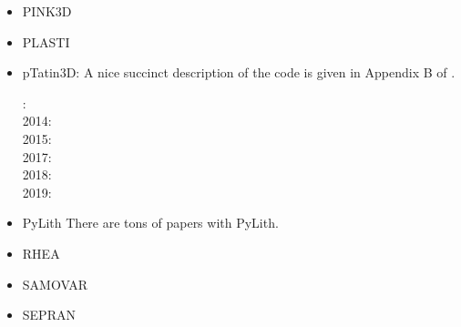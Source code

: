 \begin{itemize}
\item PINK3D

{\small
\noindent
\cite{vosc15}
}


\item PLASTI

{\small
\noindent
\cite{fuwb06}
}

\item pTatin3D: A nice succinct description of the code is given in Appendix B of \cite{lemh17}. 

{\small
{}: \cite{phil13}\\
2014: \cite{mabl14}\\
2015: \cite{mabl15}\\
2017: \cite{lemh17}\cite{magm17}\\
2018: \cite{jolp18}\\
2019: \cite{jolm19}
}

\item PyLith 
There are tons of papers with PyLith. 


{\small
\noindent
\cite{aakw13}
}

\item RHEA 

{\small
\noindent
\cite{bugg08}
\cite{stgb10}
\cite{algs12}
\cite{busa13}
}

\item SAMOVAR

{\small
\noindent
\cite{egat10}
}

\item {\codefont SEPRAN} 


\end{itemize}
